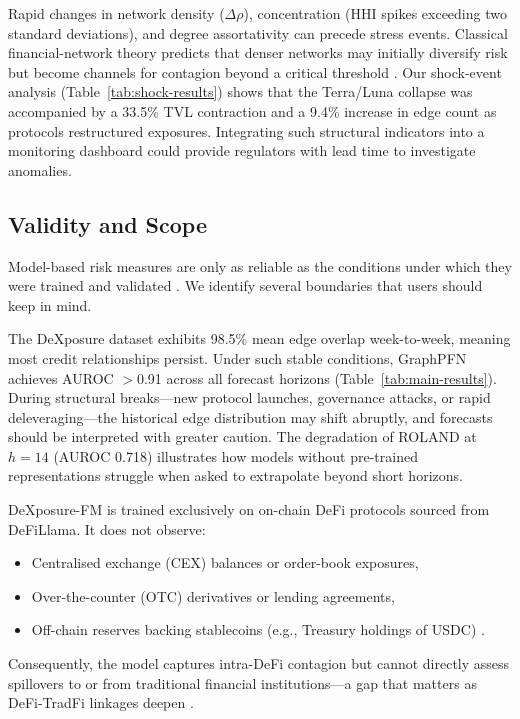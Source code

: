 \documentclass[preprint,12pt]{elsarticle}
\renewcommand{\paragraph}[1]{}
\begin{document}
\paragraph{Early warning signals.}
Rapid changes in network density ($\Delta\rho$), concentration (HHI spikes exceeding two standard deviations), and degree assortativity can precede stress events. Classical financial-network theory predicts that denser networks may initially diversify risk but become channels for contagion beyond a critical threshold \citep{Acemoglu2013,GaiKapadia2010Contagion}. Our shock-event analysis (Table~\ref{tab:shock-results}) shows that the Terra/Luna collapse was accompanied by a 33.5\% TVL contraction and a 9.4\% increase in edge count as protocols restructured exposures. Integrating such structural indicators into a monitoring dashboard could provide regulators with lead time to investigate anomalies.


\subsection{Validity and Scope}
\label{subsec:validity}

Model-based risk measures are only as reliable as the conditions under which they were trained and validated \citep{MullainathanSpiess2017}. We identify several boundaries that users should keep in mind.

\paragraph{Stable versus turbulent regimes.}
The DeXposure dataset exhibits 98.5\% mean edge overlap week-to-week, meaning most credit relationships persist. Under such stable conditions, GraphPFN achieves AUROC $>$0.91 across all forecast horizons (Table~\ref{tab:main-results}). During structural breaks---new protocol launches, governance attacks, or rapid deleveraging---the historical edge distribution may shift abruptly, and forecasts should be interpreted with greater caution. The degradation of ROLAND at $h=14$ (AUROC 0.718) illustrates how models without pre-trained representations struggle when asked to extrapolate beyond short horizons.

\paragraph{Coverage.}
DeXposure-FM is trained exclusively on on-chain DeFi protocols sourced from DeFiLlama. It does not observe:
\begin{itemize}
  \item Centralised exchange (CEX) balances or order-book exposures,
  \item Over-the-counter (OTC) derivatives or lending agreements,
  \item Off-chain reserves backing stablecoins (e.g., Treasury holdings of USDC) \citep{AnaduEtAl2023StablecoinsMMF}.
\end{itemize}
Consequently, the model captures intra-DeFi contagion but cannot directly assess spillovers to or from traditional financial institutions---a gap that matters as DeFi-TradFi linkages deepen \citep{ESRB2025}.
\end{document}
